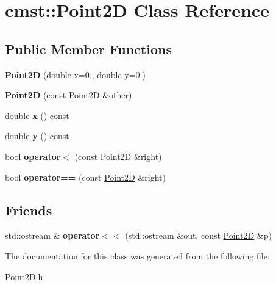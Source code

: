 \hypertarget{classcmst_1_1_point2_d}{}\section{cmst\+:\+:Point2D Class Reference}
\label{classcmst_1_1_point2_d}
\subsection*{Public Member Functions}
\begin{DoxyCompactItemize}
\item 
{\bfseries Point2D} (double x=0., double y=0.)\hypertarget{classcmst_1_1_point2_d_a2291fb012502a29399852810b5a081a8}{}\label{classcmst_1_1_point2_d_a2291fb012502a29399852810b5a081a8}

\item 
{\bfseries Point2D} (const \hyperlink{classcmst_1_1_point2_d}{Point2D} \&other)\hypertarget{classcmst_1_1_point2_d_a24e903416a709a44f844b93c7295ed67}{}\label{classcmst_1_1_point2_d_a24e903416a709a44f844b93c7295ed67}

\item 
double {\bfseries x} () const \hypertarget{classcmst_1_1_point2_d_a7745045ba529c4f2a2a0384974a42448}{}\label{classcmst_1_1_point2_d_a7745045ba529c4f2a2a0384974a42448}

\item 
double {\bfseries y} () const \hypertarget{classcmst_1_1_point2_d_a15a4383f1c181b7c7518ccac6f578564}{}\label{classcmst_1_1_point2_d_a15a4383f1c181b7c7518ccac6f578564}

\item 
bool {\bfseries operator$<$} (const \hyperlink{classcmst_1_1_point2_d}{Point2D} \&right)\hypertarget{classcmst_1_1_point2_d_a07c101f4fb6663aaa6c32de475a149fe}{}\label{classcmst_1_1_point2_d_a07c101f4fb6663aaa6c32de475a149fe}

\item 
bool {\bfseries operator==} (const \hyperlink{classcmst_1_1_point2_d}{Point2D} \&right)\hypertarget{classcmst_1_1_point2_d_a9544f3c9e53240832f8323e75d75a042}{}\label{classcmst_1_1_point2_d_a9544f3c9e53240832f8323e75d75a042}

\end{DoxyCompactItemize}
\subsection*{Friends}
\begin{DoxyCompactItemize}
\item 
std\+::ostream \& {\bfseries operator$<$$<$} (std\+::ostream \&out, const \hyperlink{classcmst_1_1_point2_d}{Point2D} \&p)\hypertarget{classcmst_1_1_point2_d_a538910ff384fb4f3f02d785a99e222cf}{}\label{classcmst_1_1_point2_d_a538910ff384fb4f3f02d785a99e222cf}

\end{DoxyCompactItemize}


The documentation for this class was generated from the following file\+:\begin{DoxyCompactItemize}
\item 
Point2\+D.\+h\end{DoxyCompactItemize}
